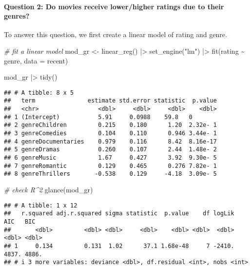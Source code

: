 \documentclass[
]{article}
\newenvironment{Shaded}{\begin{snugshade}}{\end{snugshade}}
\newcommand{\AttributeTok}[1]{\textcolor[rgb]{0.77,0.63,0.00}{#1}}
\newcommand{\CommentTok}[1]{\textcolor[rgb]{0.56,0.35,0.01}{\textit{#1}}}
\newcommand{\FunctionTok}[1]{\textcolor[rgb]{0.00,0.00,0.00}{#1}}
\newcommand{\NormalTok}[1]{#1}
\newcommand{\OtherTok}[1]{\textcolor[rgb]{0.56,0.35,0.01}{#1}}
\newcommand{\SpecialCharTok}[1]{\textcolor[rgb]{0.00,0.00,0.00}{#1}}
\newcommand{\StringTok}[1]{\textcolor[rgb]{0.31,0.60,0.02}{#1}}
\begin{document}
\hypertarget{question-2-do-movies-receive-lowerhigher-ratings-due-to-their-genres}{%
\paragraph{Question 2: Do movies receive lower/higher ratings due to
their
genres?}\label{question-2-do-movies-receive-lowerhigher-ratings-due-to-their-genres}}

To answer this question, we first create a linear model of rating and
genre.

\begin{Shaded}
\begin{Highlighting}[]
\CommentTok{\# fit a linear model}
\NormalTok{mod\_gr }\OtherTok{\textless{}{-}} \FunctionTok{linear\_reg}\NormalTok{() }\SpecialCharTok{|\textgreater{}}
  \FunctionTok{set\_engine}\NormalTok{(}\StringTok{"lm"}\NormalTok{) }\SpecialCharTok{|\textgreater{}}
  \FunctionTok{fit}\NormalTok{(rating }\SpecialCharTok{\textasciitilde{}}\NormalTok{ genre, }\AttributeTok{data =}\NormalTok{ recent)}

\NormalTok{mod\_gr }\SpecialCharTok{|\textgreater{}}
  \FunctionTok{tidy}\NormalTok{()}
\end{Highlighting}
\end{Shaded}

\begin{verbatim}
## # A tibble: 8 x 5
##   term               estimate std.error statistic  p.value
##   <chr>                 <dbl>     <dbl>     <dbl>    <dbl>
## 1 (Intercept)           5.91     0.0988    59.8   0       
## 2 genreChildren         0.215    0.180      1.20  2.32e- 1
## 3 genreComedies         0.104    0.110      0.946 3.44e- 1
## 4 genreDocumentaries    0.979    0.116      8.42  8.16e-17
## 5 genreDramas           0.260    0.107      2.44  1.48e- 2
## 6 genreMusic            1.67     0.427      3.92  9.30e- 5
## 7 genreRomantic         0.129    0.465      0.276 7.82e- 1
## 8 genreThrillers       -0.538    0.129     -4.18  3.09e- 5
\end{verbatim}

\begin{Shaded}
\begin{Highlighting}[]
\CommentTok{\# check R\^{}2}
\FunctionTok{glance}\NormalTok{(mod\_gr)}
\end{Highlighting}
\end{Shaded}

\begin{verbatim}
## # A tibble: 1 x 12
##   r.squared adj.r.squared sigma statistic  p.value    df logLik   AIC   BIC
##       <dbl>         <dbl> <dbl>     <dbl>    <dbl> <dbl>  <dbl> <dbl> <dbl>
## 1     0.134         0.131  1.02      37.1 1.68e-48     7 -2410. 4837. 4886.
## # i 3 more variables: deviance <dbl>, df.residual <int>, nobs <int>
\end{verbatim}
\end{document}
